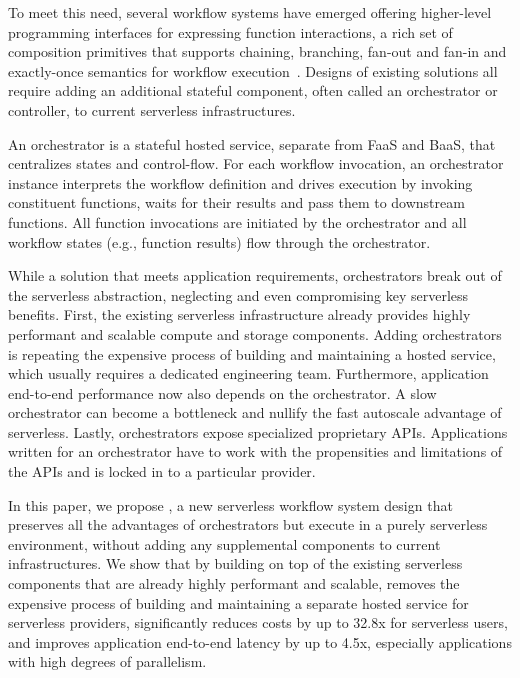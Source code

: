 To meet this need, several workflow systems have emerged offering
higher-level programming interfaces for expressing function interactions, a
rich set of composition primitives that supports chaining, branching, fan-out
and fan-in and exactly-once semantics for workflow execution~\cite{excamera,
gg-atc, aws-step-functions, google-cloud-composer, google-workflows,
durable-functions}. Designs of existing solutions all require adding an
additional stateful component, often called an orchestrator or controller, to
current serverless infrastructures.

An orchestrator is a stateful hosted service, separate from FaaS and BaaS,
that centralizes states and control-flow. For each workflow invocation, an
orchestrator instance interprets the workflow definition and drives execution
by invoking constituent functions, waits for their results and pass them to
downstream functions. All function invocations are initiated by the
orchestrator and all workflow states (e.g., function results) flow through the
orchestrator.

While a solution that meets application requirements, orchestrators break out
of the serverless abstraction, neglecting and even compromising key serverless
benefits. First, the existing serverless infrastructure already provides
highly performant and scalable compute and storage components. Adding
orchestrators is repeating the expensive process of building and maintaining a
hosted service, which usually requires a dedicated engineering team.
Furthermore, application end-to-end performance now also depends on the
orchestrator. A slow orchestrator can become a bottleneck and nullify the fast
autoscale advantage of serverless. Lastly, orchestrators expose specialized
proprietary APIs. Applications written for an orchestrator have to work with
the propensities and limitations of the APIs and is locked in to a particular
provider. 

In this paper, we propose \name{}, a new serverless workflow system design
that preserves all the advantages of orchestrators but execute in a purely
serverless environment, without adding any supplemental components to current
infrastructures. We show that by building on top of the existing serverless
components that are already highly performant and scalable, \name{} removes
the expensive process of building and maintaining a separate hosted service
for serverless providers, significantly reduces costs by up to 32.8x for
serverless users, and improves application end-to-end latency by up to 4.5x,
especially applications with high degrees of parallelism.

